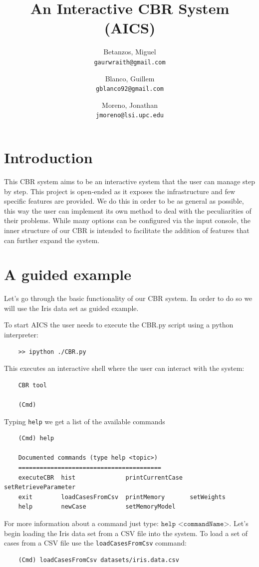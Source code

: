 \documentclass[11pt]{article}
\title{An Interactive CBR System (AICS)}
\author{
  Betanzos, Miguel\\
  \texttt{gaurwraith@gmail.com}
  \and
  Blanco, Guillem\\
  \texttt{gblanco92@gmail.com}
  \and
  Moreno, Jonathan\\
  \texttt{jmoreno@lsi.upc.edu}
}
\date{}
\begin{document}
\maketitle


\section{Introduction}

This CBR system aims to be an interactive system that the user can manage step by step. This project is open-ended as it exposes the infrastructure and few specific features are provided. We do this in order to be as general as possible, this way the user can implement its own method to deal with the peculiarities of their problems. While many options can be configured via the input console, the inner structure of our CBR is intended to facilitate the addition of features that can further expand the system.


\section{A guided example}


Let's go through the basic functionality of our CBR system. In order to do so we will use the Iris data set as guided example.

To start AICS the user needs to execute the CBR.py script using a python interpreter:
\begin{verbatim}
    >> ipython ./CBR.py
\end{verbatim}
This executes an interactive shell where the user can interact with the system:
\begin{verbatim}
    CBR tool

    (Cmd)
\end{verbatim}
Typing \texttt{help} we get a list of the available commands
\begin{verbatim}
    (Cmd) help
    
    Documented commands (type help <topic>)
    ========================================
    executeCBR  hist              printCurrentCase  setRetrieveParameter
    exit        loadCasesFromCsv  printMemory       setWeights
    help        newCase           setMemoryModel

\end{verbatim}

For more information about a command just type: $\texttt{help <commandName>}$. Let's begin loading the Iris data set from a CSV file into the system. To load a set of cases from a CSV file use the \texttt{loadCasesFromCsv} command:
\begin{verbatim}
    (Cmd) loadCasesFromCsv datasets/iris.data.csv
\end{verbatim}
\end{document}
